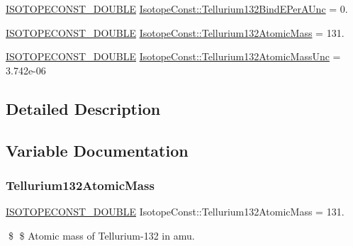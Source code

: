 \begin{DoxyCompactItemize}
\mbox{\hyperlink{group___isotope_const-_macros_ga8f45a7272ce02c0b4c65c44636ed719a}{I\+S\+O\+T\+O\+P\+E\+C\+O\+N\+S\+T\+\_\+\+D\+O\+U\+B\+LE}} \mbox{\hyperlink{group___isotope_const-_tellurium-_te132_gac43e192021bd6563b7c7440a072d539d}{Isotope\+Const\+::\+Tellurium132\+Bind\+E\+Per\+A\+Unc}} = 0.
\item 
\mbox{\hyperlink{group___isotope_const-_macros_ga8f45a7272ce02c0b4c65c44636ed719a}{I\+S\+O\+T\+O\+P\+E\+C\+O\+N\+S\+T\+\_\+\+D\+O\+U\+B\+LE}} \mbox{\hyperlink{group___isotope_const-_tellurium-_te132_ga11d70021973bce05a7ad0c9fb4e91812}{Isotope\+Const\+::\+Tellurium132\+Atomic\+Mass}} = 131.
\item 
\mbox{\hyperlink{group___isotope_const-_macros_ga8f45a7272ce02c0b4c65c44636ed719a}{I\+S\+O\+T\+O\+P\+E\+C\+O\+N\+S\+T\+\_\+\+D\+O\+U\+B\+LE}} \mbox{\hyperlink{group___isotope_const-_tellurium-_te132_gabb0b9b4e1de17858c4fff4aaa6e52a2e}{Isotope\+Const\+::\+Tellurium132\+Atomic\+Mass\+Unc}} = 3.\+742e-\/06
\end{DoxyCompactItemize}


\subsection{Detailed Description}


\subsection{Variable Documentation}
\mbox{\label{group___isotope_const-_tellurium-_te132_ga11d70021973bce05a7ad0c9fb4e91812}} 
\subsubsection{\texorpdfstring{Tellurium132\+Atomic\+Mass}{Tellurium132AtomicMass}}
{\footnotesize\ttfamily \mbox{\hyperlink{group___isotope_const-_macros_ga8f45a7272ce02c0b4c65c44636ed719a}{I\+S\+O\+T\+O\+P\+E\+C\+O\+N\+S\+T\+\_\+\+D\+O\+U\+B\+LE}} Isotope\+Const\+::\+Tellurium132\+Atomic\+Mass = 131.}

\$ \$ Atomic mass of Tellurium-\/132 in amu. \mbox{\label{group___isotope_const-_tellurium-_te132_gabb0b9b4e1de17858c4fff4aaa6e52a2e}} 
